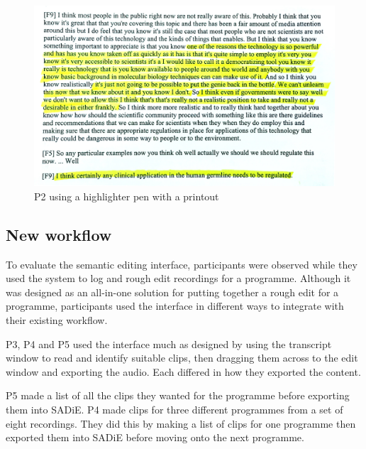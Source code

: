 

\begin{figure}[t]
\centering
  \includegraphics[width=\columnwidth]{figs/highlighting-cropped.jpg}
  \caption{P2 using a highlighter pen with a printout}
  \label{fig:highlight}
\end{figure}

\subsection{New workflow}
To evaluate the semantic editing interface, participants were observed while
they used the system to log and rough edit recordings for a programme.
Although it was designed as an all-in-one solution for putting together a rough
edit for a programme, participants used the interface in different ways to
integrate with their existing workflow.

P3, P4 and P5 used the interface much as designed by using the transcript
window to read and identify suitable clips, then dragging them across to the
edit window and exporting the audio. Each differed in how they exported the
content.

P5 made a list of all the clips they wanted for the programme before exporting
them into SADiE.  P4 made clips for three different programmes from a set
of eight recordings. They did this by making a list of clips for one programme
then exported them into SADiE before moving onto the next programme.

